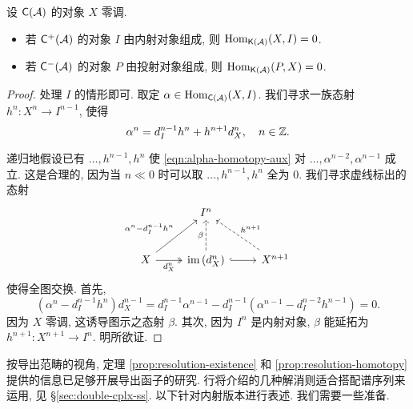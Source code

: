 \begin{lemma}\label{prop:resolution-homotopy-aux}
	设 $\mathsf{C}(\mathcal{A})$ 的对象 $X$ 零调.
	\begin{itemize}
		\item 若 $\mathsf{C}^+(\mathcal{A})$ 的对象 $I$ 由内射对象组成, 则 $\operatorname{Hom}_{\mathsf{K}(\mathcal{A})}(X, I) = 0$.
		\item 若 $\mathsf{C}^-(\mathcal{A})$ 的对象 $P$ 由投射对象组成, 则 $\operatorname{Hom}_{\mathsf{K}(\mathcal{A})}(P, X) = 0$.
	\end{itemize}
\end{lemma}
\begin{proof}
	处理 $I$ 的情形即可. 取定 $\alpha \in \operatorname{Hom}_{\mathsf{C}(\mathcal{A})}(X,I)$. 我们寻求一族态射 $h^n: X^n \to I^{n-1}$, 使得
	\begin{equation}\label{eqn:alpha-homotopy-aux}
		\alpha^n = d_I^{n-1} h^n + h^{n+1} d_X^n , \quad n \in \mathbb{Z}.
	\end{equation}

	递归地假设已有 $\ldots, h^{n-1}, h^n$ 使 \eqref{eqn:alpha-homotopy-aux} 对 $\ldots, \alpha^{n-2}, \alpha^{n-1}$ 成立. 这是合理的, 因为当 $n \ll 0$ 时可以取 $\ldots, h^{n-1}, h^n$ 全为 $0$. 我们寻求虚线标出的态射
	\[\begin{tikzcd}[row sep=large]
		& I^n & \\
		X \arrow[twoheadrightarrow, r, "{d_X^n}"'] \arrow[ru, "{\alpha^n - d_I^{n-1} h^n}"] & \Image\left( d_X^n \right) \arrow[dashed, u, "\beta"] \arrow[hookrightarrow, r] & X^{n+1} \arrow[dashed, lu, "{h^{n+1}}"']
	\end{tikzcd}\]
	使得全图交换. 首先,
	\[ \left( \alpha^n - d_I^{n-1} h^n \right) d_X^{n-1} = d_I^{n-1} \alpha^{n-1} - d_I^{n-1} \left( \alpha^{n-1} - d_I^{n-2} h^{n-1} \right) = 0. \]
	因为 $X$ 零调, 这诱导图示之态射 $\beta$. 其次, 因为 $I^n$ 是内射对象, $\beta$ 能延拓为 $h^{n+1}: X^{n+1} \to I^n$. 明所欲证.
\end{proof}

按导出范畴的视角, 定理 \ref{prop:resolution-existence} 和 \ref{prop:resolution-homotopy} 提供的信息已足够开展导出函子的研究. 行将介绍的几种解消则适合搭配谱序列来运用, 见 \S\ref{sec:double-cplx-ss}. 以下针对内射版本进行表述. 我们需要一些准备.

